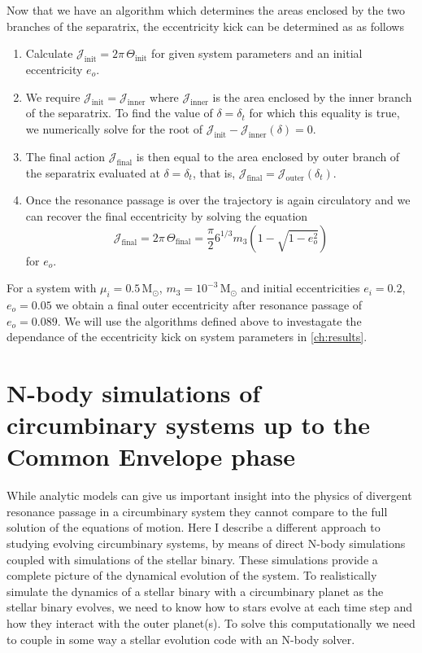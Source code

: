 \documentclass[ twoside,openright,titlepage,numbers=noenddot,headinclude,%
                footinclude=true,cleardoublepage=empty,abstractoff, %
                BCOR=5mm,paper=a4,fontsize=11pt,%
                american,%
                ]{scrreprt}
\begin{document}
Now that we have an algorithm which determines the areas enclosed by the two
branches of the separatrix, the eccentricity kick can be determined as
as follows
\begin{enumerate}
    \item Calculate $\mathcal{J}_\text{init}=2\pi\,\Theta_\text{init}$ for given
        system parameters and an initial eccentricity $e_o$.
    \item We require $\mathcal{J}_\text{init}=\mathcal{J}_\text{inner}$ 
        where $\mathcal{J}_\text{inner}$ is the area enclosed by the inner
        branch of the separatrix. To find the value of $\delta=\delta_t$ for
        which this equality is true, we numerically solve for the root of
        $\mathcal{J}_\text{init}-\mathcal{J}_\text{inner}(\delta)=0$.
    \item The final action $\mathcal{J}_\text{final}$ is then equal to
        the area enclosed by outer branch of the separatrix evaluated at
        $\delta=\delta_t$, that is, $\mathcal{J}_\text{final}=
        \mathcal{J}_\text{outer}(\delta_t)$.
    \item Once the resonance passage is over the trajectory is again circulatory
        and we can recover the final eccentricity by solving the equation
        \begin{equation}
            \mathcal{J}_\text{final}=2\pi\,\Theta_\text{final}=
            \frac{\pi}{2} 6^{1/3}m_3\left(1-\sqrt{1-e_o^2}\right)
        \end{equation}
        for $e_o$. 
\end{enumerate}
For a system with $\mu_i=0.5\,\text{M}_\odot$, $m_3=10^{-3}\,\text{M}_\odot$ 
and initial eccentricities $e_i=0.2$, $e_o=0.05$ we obtain a final outer
eccentricity after resonance passage of $e_o=0.089$. We will use the
algorithms defined above to investagate the dependance of the eccentricity
kick on system parameters in \cref{ch:results}.
\clearpage
\chapter{N-body simulations of circumbinary systems up to the Common Envelope phase}
\label{ch:numerical_analysis}
While analytic models can give us important insight into the physics 
of divergent resonance passage in a circumbinary system
they cannot compare to the full solution of the equations of motion.
Here I describe a different approach to studying evolving
circumbinary systems, by means of direct
N-body simulations coupled with simulations of the stellar binary. 
These simulations provide a complete picture of the dynamical evolution
of the system. To realistically simulate the dynamics of a stellar binary
with a circumbinary planet as the stellar binary evolves, we need to know
how to stars evolve at each time step and how they interact with the outer
planet(s). To solve this computationally we need to couple in some way
a stellar evolution code with an N-body solver. 
\end{document}
